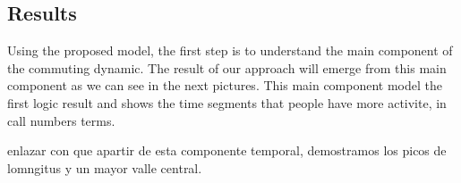 \newpage
\subsection{Results}

Using the proposed model, the first step is to understand the main component of the commuting dynamic. The result of our approach will emerge from this main component as we can see in the next pictures. This main component model the first logic result and shows the time segments that people have more activite, in call numbers terms.

\begin{figure}[ht]
\centering
{}
\label{fig:fig1}
\end{figure}


enlazar con que apartir de esta componente temporal, demostramos los picos de lomngitus y un mayor valle central.